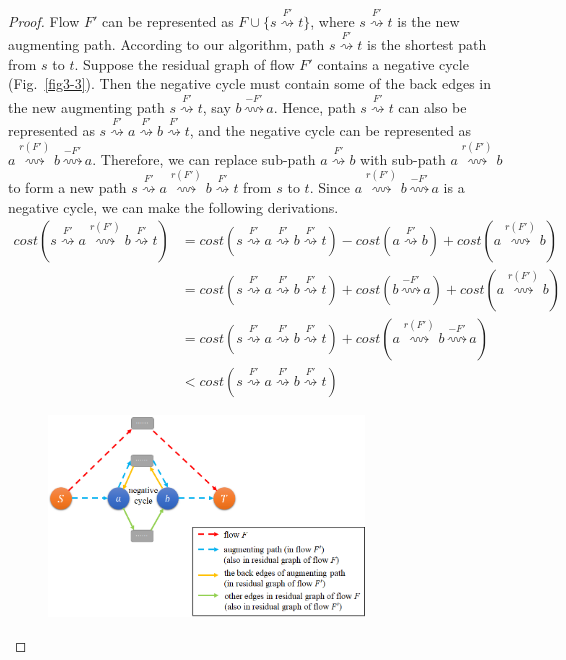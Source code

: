 \documentclass[12pt,a4paper]{article}
\theoremstyle{definition}
\begin{document}
\begin{enumerate}
\begin{proof}
    Flow $F'$ can be represented as $F \cup \{ s \stackrel{F'}{\rightsquigarrow} t\}$, where $s \stackrel{F'}{\rightsquigarrow} t$ is the new augmenting path. According to our algorithm, path $s \stackrel{F'}{\rightsquigarrow} t$ is the shortest path from $s$ to $t$. Suppose the residual graph of flow $F'$ contains a negative cycle (Fig.~\ref{fig3-3}). Then the negative cycle must contain some of the back edges in the new augmenting path $s \stackrel{F'}{\rightsquigarrow} t$, say $b \stackrel{-F'}{\rightsquigarrow} a$. Hence, path $s \stackrel{F'}{\rightsquigarrow} t$ can also be represented as $s \stackrel{F'}{\rightsquigarrow} a \stackrel{F'}{\rightsquigarrow} b \stackrel{F'}{\rightsquigarrow} t$, and the negative cycle can be represented as $a \stackrel{r(F')}{\rightsquigarrow} b \stackrel{-F'}{\rightsquigarrow} a$. Therefore, we can replace sub-path $a \stackrel{F'}{\rightsquigarrow} b$ with sub-path $a \stackrel{r(F')}{\rightsquigarrow} b$ to form a new path $s \stackrel{F'}{\rightsquigarrow} a \stackrel{r(F')}{\rightsquigarrow} b \stackrel{F'}{\rightsquigarrow} t$ from $s$ to $t$. Since $a \stackrel{r(F')}{\rightsquigarrow} b \stackrel{-F'}{\rightsquigarrow} a$ is a negative cycle, we can make the following derivations.
    \begin{displaymath}
    \begin{aligned}
    cost(s \stackrel{F'}{\rightsquigarrow} a \stackrel{r(F')}{\rightsquigarrow} b \stackrel{F'}{\rightsquigarrow} t) &= cost(s \stackrel{F'}{\rightsquigarrow} a \stackrel{F'}{\rightsquigarrow} b \stackrel{F'}{\rightsquigarrow} t) - cost(a \stackrel{F'}{\rightsquigarrow} b) + cost(a \stackrel{r(F')}{\rightsquigarrow} b) \\
    &= cost(s \stackrel{F'}{\rightsquigarrow} a \stackrel{F'}{\rightsquigarrow} b \stackrel{F'}{\rightsquigarrow} t) + cost(b \stackrel{-F'}{\rightsquigarrow} a) + cost(a \stackrel{r(F')}{\rightsquigarrow} b) \\
    &= cost(s \stackrel{F'}{\rightsquigarrow} a \stackrel{F'}{\rightsquigarrow} b \stackrel{F'}{\rightsquigarrow} t) + cost(a \stackrel{r(F')}{\rightsquigarrow} b \stackrel{-F'}{\rightsquigarrow} a) \\
    &< cost(s \stackrel{F'}{\rightsquigarrow} a \stackrel{F'}{\rightsquigarrow} b \stackrel{F'}{\rightsquigarrow} t)
    \end{aligned}
    \end{displaymath}
    \begin{figure}[htbp]
      \centering
      \includegraphics[width=3.3in]{pics/prob3-3.png}\\

\end{figure}
\end{proof}
\end{enumerate}
\end{document}

